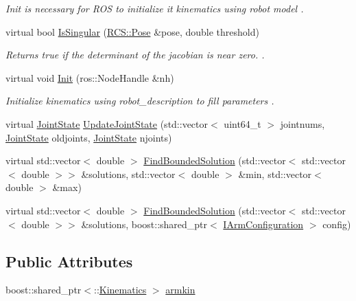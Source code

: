 \begin{DoxyCompactItemize}
\begin{DoxyCompactList}\small\item\em Init is necessary for R\-O\-S to initialize it kinematics using robot model . \end{DoxyCompactList}\item 
virtual bool \hyperlink{classIKinematics_aac7d4f55bbd9228af0a7b733f857fcab}{Is\-Singular} (\hyperlink{namespaceRCS_aa07e45d8a50e30064283d2b38087f999}{R\-C\-S\-::\-Pose} \&pose, double threshold)
\begin{DoxyCompactList}\small\item\em Returns true if the determinant of the jacobian is near zero. . \end{DoxyCompactList}\item 
virtual void \hyperlink{classIKinematics_aa5c1c9225650b5225f3aa80e06ef1587}{Init} (ros\-::\-Node\-Handle \&nh)
\begin{DoxyCompactList}\small\item\em Initialize kinematics using robot\-\_\-description to fill parameters . \end{DoxyCompactList}\item 
virtual \hyperlink{RCS_8h_aa4adb93a26caa4dacba9c9614e283245}{Joint\-State} \hyperlink{classIKinematics_a69969236af3de600973b57d52444c4d7}{Update\-Joint\-State} (std\-::vector$<$ uint64\-\_\-t $>$ jointnums, \hyperlink{RCS_8h_aa4adb93a26caa4dacba9c9614e283245}{Joint\-State} oldjoints, \hyperlink{RCS_8h_aa4adb93a26caa4dacba9c9614e283245}{Joint\-State} njoints)
\item 
virtual std\-::vector$<$ double $>$ \hyperlink{classIKinematics_ab792f1f7ee1f2a34cb33eae02f1a91f9}{Find\-Bounded\-Solution} (std\-::vector$<$ std\-::vector$<$ double $>$$>$ \&solutions, std\-::vector$<$ double $>$ \&min, std\-::vector$<$ double $>$ \&max)
\item 
virtual std\-::vector$<$ double $>$ \hyperlink{classIKinematics_a5d2d196c29041544fd604409200a1437}{Find\-Bounded\-Solution} (std\-::vector$<$ std\-::vector$<$ double $>$$>$ \&solutions, boost\-::shared\-\_\-ptr$<$ \hyperlink{classIArmConfiguration}{I\-Arm\-Configuration} $>$ config)
\end{DoxyCompactItemize}
\subsection*{Public Attributes}
\begin{DoxyCompactItemize}
\item 
boost\-::shared\-\_\-ptr$<$\-::\hyperlink{classKinematics}{Kinematics} $>$ \hyperlink{classIKinematics_a4d9c2ff5cd606746f9f762d2c8e2d7c2}{armkin}
\end{DoxyCompactItemize}
